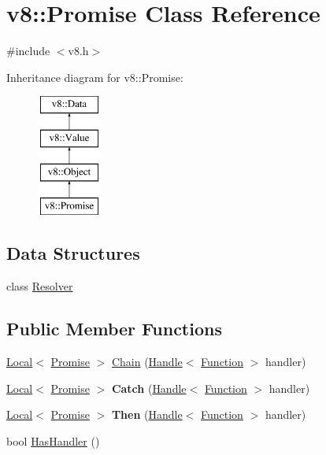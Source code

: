 \hypertarget{classv8_1_1Promise}{}\section{v8\+:\+:Promise Class Reference}
\label{classv8_1_1Promise}


{\ttfamily \#include $<$v8.\+h$>$}

Inheritance diagram for v8\+:\+:Promise\+:\begin{figure}[H]
\begin{center}
\leavevmode
\includegraphics[height=4.000000cm]{classv8_1_1Promise}
\end{center}
\end{figure}
\subsection*{Data Structures}
\begin{DoxyCompactItemize}
\item 
class \hyperlink{classv8_1_1Promise_1_1Resolver}{Resolver}
\end{DoxyCompactItemize}
\subsection*{Public Member Functions}
\begin{DoxyCompactItemize}
\item 
\hyperlink{classv8_1_1Local}{Local}$<$ \hyperlink{classv8_1_1Promise}{Promise} $>$ \hyperlink{classv8_1_1Promise_af56616dc11de23d6d515b0fa5d42e1eb}{Chain} (\hyperlink{classv8_1_1Handle}{Handle}$<$ \hyperlink{classv8_1_1Function}{Function} $>$ handler)
\item 
\hypertarget{classv8_1_1Promise_aab3dea5d0875e1506b9c8fc822b0e005}{}\hyperlink{classv8_1_1Local}{Local}$<$ \hyperlink{classv8_1_1Promise}{Promise} $>$ {\bfseries Catch} (\hyperlink{classv8_1_1Handle}{Handle}$<$ \hyperlink{classv8_1_1Function}{Function} $>$ handler)\label{classv8_1_1Promise_aab3dea5d0875e1506b9c8fc822b0e005}

\item 
\hypertarget{classv8_1_1Promise_a22a7ce609a7ddf0b15bf316e61b0178f}{}\hyperlink{classv8_1_1Local}{Local}$<$ \hyperlink{classv8_1_1Promise}{Promise} $>$ {\bfseries Then} (\hyperlink{classv8_1_1Handle}{Handle}$<$ \hyperlink{classv8_1_1Function}{Function} $>$ handler)\label{classv8_1_1Promise_a22a7ce609a7ddf0b15bf316e61b0178f}

\item 
bool \hyperlink{classv8_1_1Promise_aeea8bdfdbe2291632d7f0d45394c1722}{Has\+Handler} ()
\end{DoxyCompactItemize}
